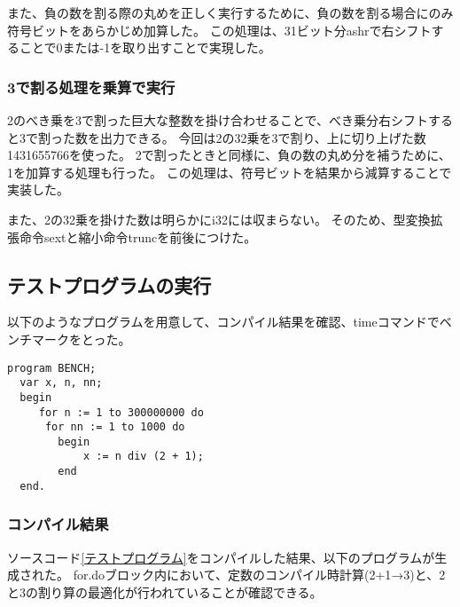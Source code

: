 また、負の数を割る際の丸めを正しく実行するために、負の数を割る場合にのみ符号ビットをあらかじめ加算した。
この処理は、31ビット分ashrで右シフトすることで0または-1を取り出すことで実現した。

\subsubsection{3で割る処理を乗算で実行}
2のべき乗を3で割った巨大な整数を掛け合わせることで、べき乗分右シフトすると3で割った数を出力できる。
今回は2の32乗を3で割り、上に切り上げた数1431655766を使った。
2で割ったときと同様に、負の数の丸め分を補うために、1を加算する処理も行った。
この処理は、符号ビットを結果から減算することで実装した。

また、2の32乗を掛けた数は明らかにi32には収まらない。
そのため、型変換拡張命令sextと縮小命令truncを前後につけた。

\subsection{テストプログラムの実行}
以下のようなプログラムを用意して、コンパイル結果を確認、timeコマンドでベンチマークをとった。
\begin{lstlisting}[caption={テストプログラム},label={テストプログラム}]
  program BENCH;
  var x, n, nn;
  begin
     for n := 1 to 300000000 do
      for nn := 1 to 1000 do
        begin
            x := n div (2 + 1);
        end
  end.
\end{lstlisting}

\subsubsection{コンパイル結果}
ソースコード\ref{テストプログラム}をコンパイルした結果、以下のプログラムが生成された。
for.doブロック内において、定数のコンパイル時計算(2+1→3)と、2と3の割り算の最適化が行われていることが確認できる。

